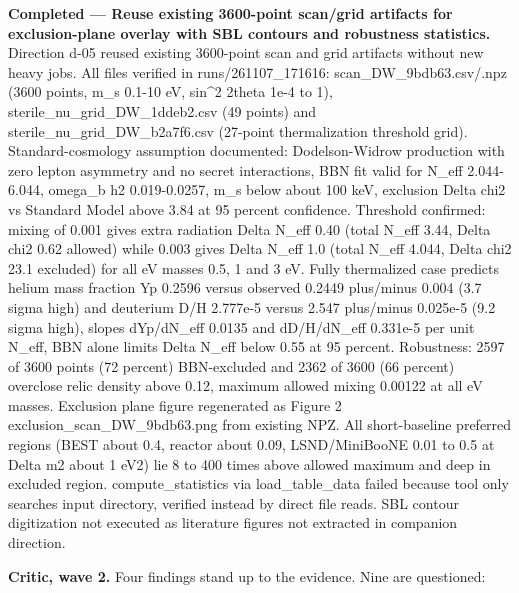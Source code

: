 \documentclass[11pt,a4paper]{article}
\begin{document}
\textbf{Completed --- Reuse existing 3600-point scan/grid artifacts for exclusion-plane overlay with SBL contours and robustness statistics.} Direction d-05 reused existing 3600-point scan and grid artifacts without new heavy jobs. All files verified in runs/261107\_171616: scan\_DW\_9bdb63.csv/.npz (3600 points, m\_s 0.1-10 eV, sin\textasciicircum{}2 2theta 1e-4 to 1), sterile\_nu\_grid\_DW\_1ddeb2.csv (49 points) and sterile\_nu\_grid\_DW\_b2a7f6.csv (27-point thermalization threshold grid). Standard-cosmology assumption documented: Dodelson-Widrow production with zero lepton asymmetry and no secret interactions, BBN fit valid for N\_eff 2.044-6.044, omega\_b h2 0.019-0.0257, m\_s below about 100 keV, exclusion Delta chi2 vs Standard Model above 3.84 at 95 percent confidence. Threshold confirmed: mixing of 0.001 gives extra radiation Delta N\_eff 0.40 (total N\_eff 3.44, Delta chi2 0.62 allowed) while 0.003 gives Delta N\_eff 1.0 (total N\_eff 4.044, Delta chi2 23.1 excluded) for all eV masses 0.5, 1 and 3 eV. Fully thermalized case predicts helium mass fraction Yp 0.2596 versus observed 0.2449 plus/minus 0.004 (3.7 sigma high) and deuterium D/H 2.777e-5 versus 2.547 plus/minus 0.025e-5 (9.2 sigma high), slopes dYp/dN\_eff 0.0135 and dD/H/dN\_eff 0.331e-5 per unit N\_eff, BBN alone limits Delta N\_eff below 0.55 at 95 percent. Robustness: 2597 of 3600 points (72 percent) BBN-excluded and 2362 of 3600 (66 percent) overclose relic density above 0.12, maximum allowed mixing 0.00122 at all eV masses. Exclusion plane figure regenerated as Figure 2 exclusion\_scan\_DW\_9bdb63.png from existing NPZ. All short-baseline preferred regions (BEST about 0.4, reactor about 0.09, LSND/MiniBooNE 0.01 to 0.5 at Delta m2 about 1 eV2) lie 8 to 400 times above allowed maximum and deep in excluded region. compute\_statistics via load\_table\_data failed because tool only searches input directory, verified instead by direct file reads. SBL contour digitization not executed as literature figures not extracted in companion direction.

\textbf{Critic, wave 2.} Four findings stand up to the evidence. Nine are questioned:
\end{document}
